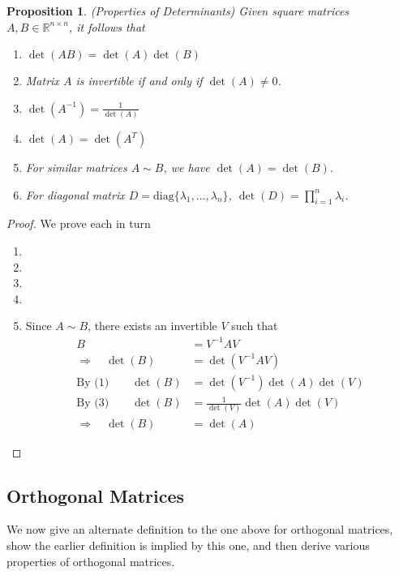 \documentclass[12pt]{article}
\numberwithin{equation}{section} %
\theoremstyle{plain}
\newtheorem{prop}[thm]{Proposition}
\theoremstyle{definition}
\theoremstyle{remark}
\newcommand{\diag}{\text{diag}}
\newcommand{\R}{\mathbb{R}}
\begin{document}
\begin{prop}{\emph{(Properties of Determinants)}}
Given square matrices $A,B\in \R^{n\times n}$, it follows that
\begin{enumerate}
  \item $\det(AB) = \det(A) \det(B)$
  \item Matrix $A$ is invertible if and only if $\det(A) \neq 0$.
  \item $\det(A^{-1}) = \frac{1}{\det(A)}$
  \item $\det(A) = \det(A^T)$
  \item For similar matrices $A\sim B$, we have $\det(A) = \det(B)$.
  \item For diagonal matrix $D=\diag\{\lambda_1,\ldots,\lambda_n\}$,
    $\det(D) = \prod^n_{i=1} \lambda_i$.
\end{enumerate}
\end{prop}
\begin{proof}
We prove each in turn
\begin{enumerate}
  \item
  \item
  \item
  \item
  \item Since $A\sim B$, there exists an invertible $V$ such that
    \begin{align*}
      B &= V^{-1} A V\\
      \Rightarrow\quad
      \det(B) &= \det(V^{-1} A V)\\
      \text{By (1)} \quad\quad
      \det(B) &= \det(V^{-1}) \det(A) \det(V)\\
      \text{By (3)} \quad\quad
      \det(B) &= \frac{1}{\det(V)} \det(A) \det(V)\\
      \Rightarrow\quad
      \det(B) &= \det(A)
    \end{align*}
\end{enumerate}
\end{proof}

\clearpage
\subsection{Orthogonal Matrices}

We now give an alternate definition to the one above for orthogonal
matrices, show the earlier definition is implied by this one, and then
derive various properties of orthogonal matrices.
\end{document}

